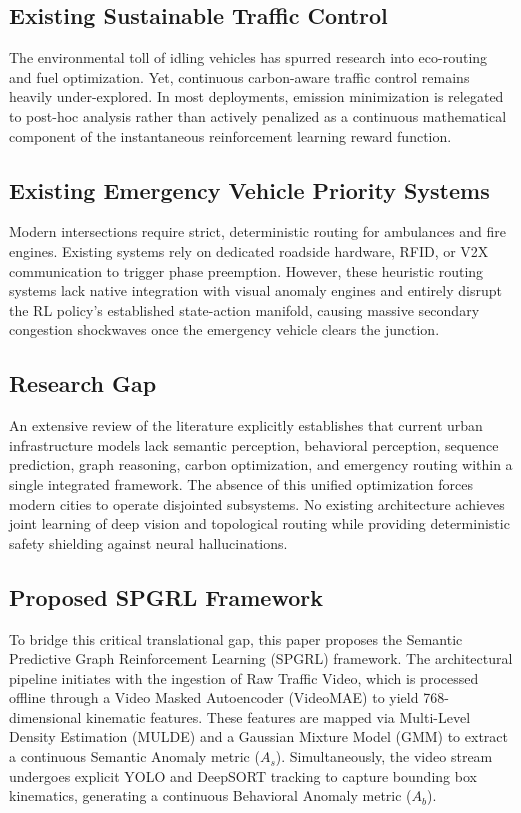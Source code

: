 \documentclass[journal]{IEEEtran}
\begin{document}
\subsection{Existing Sustainable Traffic Control}
The environmental toll of idling vehicles has spurred research into eco-routing and fuel optimization. Yet, continuous carbon-aware traffic control remains heavily under-explored. In most deployments, emission minimization is relegated to post-hoc analysis rather than actively penalized as a continuous mathematical component of the instantaneous reinforcement learning reward function.

\subsection{Existing Emergency Vehicle Priority Systems}
Modern intersections require strict, deterministic routing for ambulances and fire engines. Existing systems rely on dedicated roadside hardware, RFID, or V2X communication to trigger phase preemption. However, these heuristic routing systems lack native integration with visual anomaly engines and entirely disrupt the RL policy's established state-action manifold, causing massive secondary congestion shockwaves once the emergency vehicle clears the junction.

\subsection{Research Gap}
An extensive review of the literature explicitly establishes that current urban infrastructure models lack semantic perception, behavioral perception, sequence prediction, graph reasoning, carbon optimization, and emergency routing within a single integrated framework. The absence of this unified optimization forces modern cities to operate disjointed subsystems. No existing architecture achieves joint learning of deep vision and topological routing while providing deterministic safety shielding against neural hallucinations.

\subsection{Proposed SPGRL Framework}
To bridge this critical translational gap, this paper proposes the Semantic Predictive Graph Reinforcement Learning (SPGRL) framework. The architectural pipeline initiates with the ingestion of Raw Traffic Video, which is processed offline through a Video Masked Autoencoder (VideoMAE) to yield 768-dimensional kinematic features. These features are mapped via Multi-Level Density Estimation (MULDE) and a Gaussian Mixture Model (GMM) to extract a continuous Semantic Anomaly metric ($A_s$). Simultaneously, the video stream undergoes explicit YOLO and DeepSORT tracking to capture bounding box kinematics, generating a continuous Behavioral Anomaly metric ($A_b$).
\end{document}
